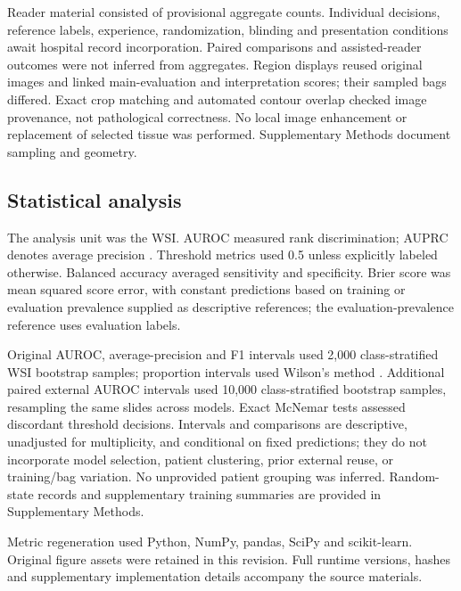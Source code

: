 Reader material consisted of provisional aggregate counts. Individual decisions, reference labels, experience, randomization, blinding and presentation conditions await hospital record incorporation. Paired comparisons and assisted-reader outcomes were not inferred from aggregates. Region displays reused original images and linked main-evaluation and interpretation scores; their sampled bags differed. Exact crop matching and automated contour overlap checked image provenance, not pathological correctness. No local image enhancement or replacement of selected tissue was performed. Supplementary Methods document sampling and geometry.

\subsection{Statistical analysis}

The analysis unit was the WSI. AUROC measured rank discrimination; AUPRC denotes average precision \citep{ref18}. Threshold metrics used 0.5 unless explicitly labeled otherwise. Balanced accuracy averaged sensitivity and specificity. Brier score was mean squared score error, with constant predictions based on training or evaluation prevalence supplied as descriptive references; the evaluation-prevalence reference uses evaluation labels.

Original AUROC, average-precision and F1 intervals used 2,000 class-stratified WSI bootstrap samples; proportion intervals used Wilson's method \citep{ref19}. Additional paired external AUROC intervals used 10,000 class-stratified bootstrap samples, resampling the same slides across models. Exact McNemar tests assessed discordant threshold decisions. Intervals and comparisons are descriptive, unadjusted for multiplicity, and conditional on fixed predictions; they do not incorporate model selection, patient clustering, prior external reuse, or training/bag variation. No unprovided patient grouping was inferred. Random-state records and supplementary training summaries are provided in Supplementary Methods.

Metric regeneration used Python, NumPy, pandas, SciPy and scikit-learn. Original figure assets were retained in this revision. Full runtime versions, hashes and supplementary implementation details accompany the source materials. 

